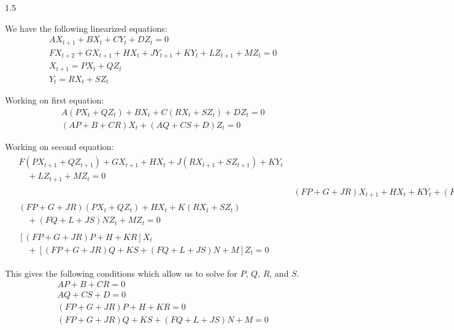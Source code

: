 \documentclass[letterpaper,12pt]{article}
\begin{document}
\begin{spacing}{1.5}

We have the following linearized equations:
\begin{align}
	& A X_{t+1} + B X_t + C Y_t + D Z_t = 0 \\
	& F X_{t+2} + G X_{t+1} + H X_t + J Y_{t+1} + K Y_t + L Z_{t+1} + M Z_t = 0 \\
	& X_{t+1} = P X_t + Q Z_t \\
	& Y_t = R X_t + S Z_t
\end{align}

Working on first equation:
\begin{align}
    & A (P X_t + Q Z_t) + B X_t + C (R X_t + S Z_t) + D Z_t = 0 \nonumber \\
    & (AP + B + CR) X_t + (AQ + CS + D) Z_t = 0 \nonumber
\end{align}

Working on second equation:
\begin{align}
    \begin{split} & F (P X_{t+1} + Q Z_{t+1}) + G X_{t+1} + H X_t + J (R X_{t+1} + S Z_{t+1}) + K Y_t \\ & \quad + L Z_{t+1} + M Z_t = 0 \end{split} \nonumber \\
    & (FP + G + JR) X_{t+1} + H X_t + K Y_t + (FQ + L + JS)Z_{t+1} + M Z_t = 0 \nonumber \\
    \begin{split} & (FP + G + JR) (P X_t + Q Z_t) + H X_t + K (R X_t + S Z_t) \\ & \quad + (FQ + L + JS) N Z_t + M Z_t = 0 \end{split} \nonumber \\
    \begin{split} & [(FP + G + JR) P + H + KR] X_t \\ & \quad + [(FP + G + JR) Q + KS +(FQ + L + JS) N + M] Z_t = 0 \end{split}
\end{align}

This gives the following conditions which allow us to solve for $P$, $Q$, $R$, and $S$.
\begin{align}
    & AP + B + CR = 0 \label{eq_cond1} \\
    & AQ + CS + D = 0 \label{eq_cond2} \\
    & (FP + G + JR) P + H + KR = 0 \label{eq_cond3} \\
    & (FP + G + JR) Q + KS +(FQ + L + JS) N + M = 0 \label{eq_cond4}
\end{align}


\end{spacing}
\end{document}
